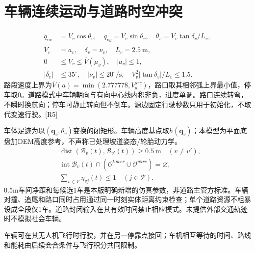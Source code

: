 \section{车辆连续运动与道路时空冲突}
\begin{align}
 \dot q_{vx}&=V_v\cos\theta_v,\quad \dot q_{vy}=V_v\sin\theta_v,\quad
 \dot\theta_v=V_v\tan\delta_v/L_v,\\
 \dot V_v&=a_v,\quad\dot\delta_v=\nu_v,\quad L_v=2.5\ \mathrm m,\\
 0&\le V_v\le\overline V(\mu_v),\quad |a_v|\le1,\\
 |\delta_v|&\le35^\circ,\quad|\nu_v|\le20^\circ/\mathrm s,\quad
 V_v^2|\tan\delta_v|/L_v\le1.5.
 \label{eng:eq:ugv}
\end{align}
\noindent 路段速度上界为$\overline V(a)=\min(2.777778,V_a^{src})$，路口取其相邻弧上界最小值，停车取0。道路模式中车辆朝向与有向中心线内积非负，进度单调。路口连续转弯，不瞬时换航向；停车可静止转向但不倒车。源边固定行驶秒数只用于初始化，不取代变速行驶。[R5]

\noindent 车体足迹为以$(\mathbf q_v,\theta_v)$变换的闭矩形。车辆高度基点取$h(\mathbf q_v)$；本模型为平面底盘加DEM高度参考，不声称已处理坡道姿态/轮胎动力学。
\begin{align}
 &\operatorname{dist}(\mathcal B_v(t),\mathcal B_{v'}(t))\ge0.5\ \mathrm m
                  \quad(v\ne v'),\label{eng:eq:groundcollision}\\
 &\operatorname{int}\mathcal B_v(t)\cap
     (\mathcal O^{tower}\cup\mathcal O^{wire})=\varnothing,\label{eng:eq:groundobstacle}\\
 &\sum_{v\in\mathcal V}\eta_{vj}(t)\le1\quad(j\in\mathcal P).
 \label{eng:eq:parkingcapacity}
\end{align}
\noindent 0.5m车间净距和每候选1车是本版明确新增的仿真参数，非道路主管方标准。车辆对撞、追尾和路口同时占用通过同一时刻实体距离约束检查；单个道路资源不粗暴设成全段仅1车。道路封闭输入在其有效时间禁止相应模式。未提供外部交通轨迹时不模拟社会车辆。

\noindent 车辆可在其无人机飞行时行驶，并在另一停靠点接回；车机相互等待的时间、路线和能耗由后续会合条件与飞行积分共同限制。
\clearpage


